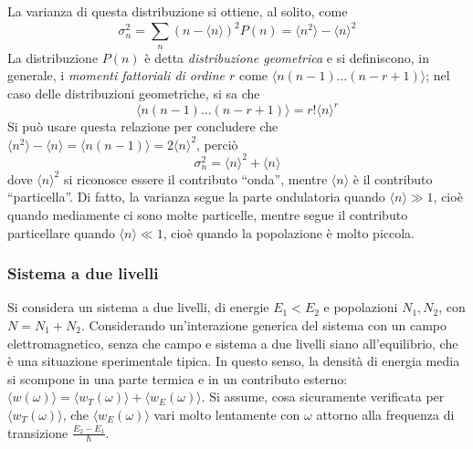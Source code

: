 \documentclass[11pt, a4paper]{scrartcl}
\theoremstyle{style}
\numberwithin{equation}{subsection}
\begin{document}
La varianza di questa distribuzione si ottiene, al solito, come
\[
\sigma _n^2  = \sum_{n}^{} \left(n - \langle n \rangle\right) ^2 P(n) = \langle n^2 \rangle - \langle n \rangle^2
\] 
La distribuzione $P(n)$ \`e detta \textit{distribuzione geometrica} e si definiscono, in generale, i \textit{momenti fattoriali di ordine $r$} come $\langle n ( n-1) \ldots (n-r+1) \rangle$; nel caso delle distribuzioni geometriche, si sa che 
\[
\langle n ( n-1) \ldots (n-r+1) \rangle = r! \langle n \rangle^r
\] 
Si pu\`o usare questa relazione per concludere che $\langle n^2 \rangle - \langle n \rangle= \langle n (n-1) \rangle= 2 \langle n \rangle^2$, perci\`o
\begin{equation}
\sigma ^2_n = \langle n \rangle^2 + \langle n \rangle
\end{equation}
dove $\langle n \rangle^2$ si riconosce essere il contributo ``onda'', mentre $\langle n \rangle$ \`e il contributo ``particella''.
Di fatto, la varianza segue la parte ondulatoria quando $\langle n \rangle\gg 1$, cio\`e quando mediamente ci sono molte particelle, mentre segue il contributo particellare quando $\langle n \rangle \ll 1$, cio\`e quando la popolazione \`e molto piccola.

\subsubsection{Sistema a due livelli}
Si considera un sistema a due livelli, di energie $E_1< E_2$ e popolazioni $N_1, N_2$, con $N = N_1+N_2$.
Considerando un'interazione generica del sistema con un campo elettromagnetico, senza che campo e sistema a due livelli siano all'equilibrio, che \`e una situazione sperimentale tipica. 
In questo senso, la densit\`a di energia media si scompone in una parte termica e in un contributo esterno: $\langle w(\omega ) \rangle = \langle w_T (\omega ) \rangle+ \langle w_E(\omega ) \rangle$.
Si assume, cosa sicuramente verificata per $\langle w_T(\omega ) \rangle$, che $\langle w_E(\omega ) \rangle$ vari molto lentamente con $\omega $ attorno alla frequenza di transizione $\frac{E_2 -E_1}{\hbar }$.
\end{document}
